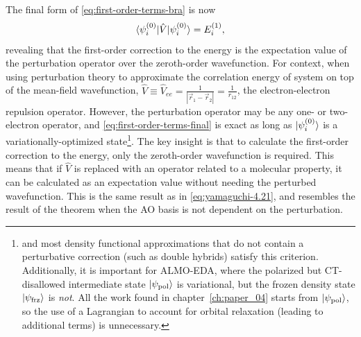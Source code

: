 \documentclass[%
class = book,%
crop = false,%
float = true,%
multi = true,%
preview = false,%
]{standalone}
\begin{document}
The final form of \eqref{eq:first-order-terms-bra} is now
\begin{equation}
  \label{eq:first-order-terms-final}
  \braket{\psi_{i}^{(0)} | \hat{V} | \psi_{i}^{(0)}} = E_{i}^{(1)},
\end{equation}
revealing that the first-order correction to the energy is the expectation value of the perturbation operator over the zeroth-order wavefunction. For context, when using perturbation theory to approximate the correlation energy of system on top of the mean-field wavefunction, \(\hat{V} \equiv \hat{V}_{ee} = \frac{1}{|\vec{r}_{1} - \vec{r}_{2}|} = \frac{1}{r_{12}}\), the electron-electron repulsion operator. However, the perturbation operator may be any one- or two-electron operator, and \eqref{eq:first-order-terms-final} is exact as long as \(\ket{\psi_{i}^{(0)}}\) is a variationally-optimized state\footnote{\hf{} and most density functional approximations that do not contain a perturbative correction (such as double hybrids) satisfy this criterion. Additionally, it is important for ALMO-EDA, where the polarized but CT-disallowed intermediate state \(\ket{\psi_{\text{pol}}}\) is variational, but the frozen density state \(\ket{\psi_{\text{frz}}}\) is \emph{not}. All the work found in chapter~\ref{ch:paper_04} starts from \(\ket{\psi_{\text{pol}}}\), so the use of a Lagrangian to account for orbital relaxation (leading to additional terms) is unnecessary.}. The key insight is that to calculate the first-order correction to the energy, only the zeroth-order wavefunction is required. This means that if \(\hat{V}\) is replaced with an operator related to a molecular property, it can be calculated as an expectation value without needing the perturbed wavefunction. This is the same result as in \eqref{eq:yamaguchi-4.21}, and resembles the result of the \hefe{} theorem when the AO basis is not dependent on the perturbation.
\end{document}
